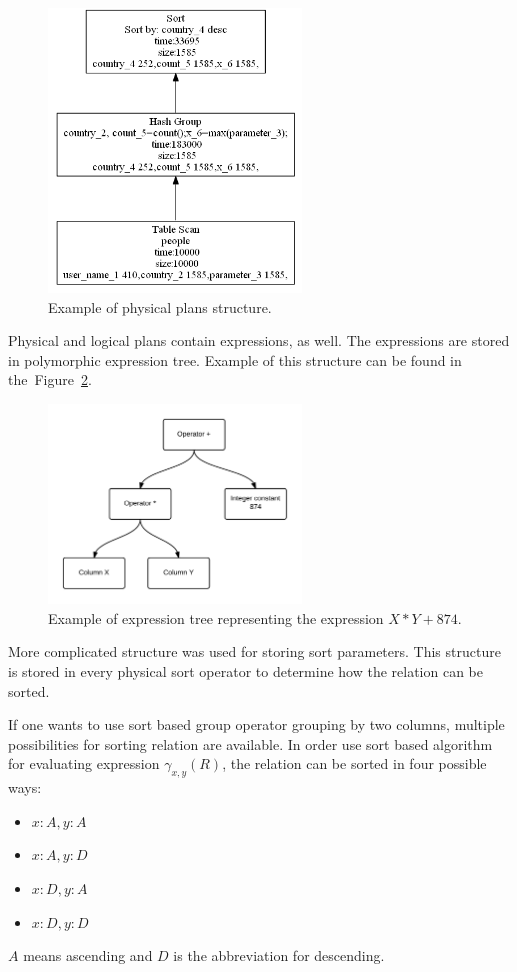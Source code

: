 \begin{figure}[h!]
  \centering
    \includegraphics[width=0.6\textwidth]{groupplan}

      \caption{Example of physical plans structure.}
          \label{fig:groupplan}
\end{figure}

Physical and logical plans contain expressions, as well. The expressions are stored in polymorphic expression tree. Example of this structure can be found in the~Figure~\ref*{fig:expressiontree}.
\begin{figure}[h!]
  \centering
    \includegraphics[width=0.6\textwidth]{expressiontree}

      \caption{Example of expression tree representing the expression $X*Y+874$.}
          \label{fig:expressiontree}
\end{figure}

More complicated structure was used for storing sort parameters. This structure is stored in every physical sort operator to determine how the relation can be sorted. 

If one wants to use sort based group operator grouping by two columns, multiple possibilities for sorting relation are available. In order use sort based algorithm for evaluating expression $\gamma_{x,y}(R)$, the relation can be sorted in four possible ways:
\begin{itemize}
\item $x:A,y:A$
\item $x:A,y:D$
\item $x:D,y:A$
\item $x:D,y:D$
\end{itemize}
$A$ means ascending and $D$ is the abbreviation for descending.

